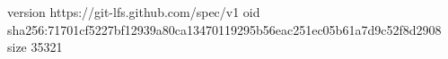 version https://git-lfs.github.com/spec/v1
oid sha256:71701cf5227bf12939a80ca13470119295b56eac251ec05b61a7d9c52f8d2908
size 35321

